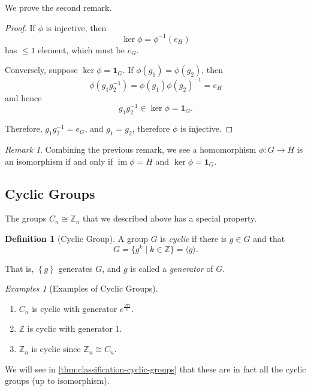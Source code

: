 \documentclass{article}
\theoremstyle{definition}
\newtheorem{definition}[theorem]{Definition}
\theoremstyle{remark}
\newtheorem{remark}[theorem]{Remark}
\newcommand{\pqty}[1]{\left(#1\right)}
\newcommand{\Bqty}[1]{\left\{#1\right\}}
\newcommand{\angBrac}[1]{\langle #1\rangle}
\newcommand{\set}[2]{\{#1\mid #2\}}
\newcommand{\functiondomain}[3]{#1:#2\to #3}
\newcommand{\inverse}{^{-1}}
\newcommand{\isomorphic}{\cong}
\newcommand{\ZZ}{\mathbb{Z}}
\newcommand{\img}{\operatorname{im}}
\newtheorem*{examples*}{Examples}
\newcommand{\trivialgp}{\mathbf{1}}
\begin{document}
We prove the second remark.

\begin{proof}
    If \(\phi\) is injective, then
    \[
        \ker \phi = \phi\inverse\pqty{e_H}
    \]
    has \(\leq 1\) element, which must be \(e_G\).

    Conversely, suppose \(\ker \phi = \trivialgp_G\). If \(\phi\pqty{g_1} = \phi\pqty{g_2}\), then
    \[
        \phi\pqty{g_1 g_2\inverse} = \phi\pqty{g_1} \phi\pqty{g_2}\inverse = e_H
    \]
    and hence
    \[
        g_1 g_2\inverse \in \ker \phi = \trivialgp_G.
    \]

    Therefore, \(g_1 g_2\inverse = e_G\), and \(g_1 = g_2\), therefore \(\phi\) is injective.
\end{proof}

\begin{remark}
    Combining the previous remark, we see a homomorphism \(\functiondomain{\phi}{G}{H}\) is an isomorphism if and only if \(\img \phi = H\) and \(\ker \phi = \trivialgp_G\).
\end{remark}

\subsection{Cyclic Groups}
\label{sec:cyclic-groups}

The groups \(C_n \isomorphic \ZZ_n\) that we described above has a special property.

\begin{definition}[Cyclic Group]
    \label{def:cyclic-group}%
    A group \(G\) is \emph{cyclic} if there is \(g \in G\) and that
    \[
        G = \set{g^k}{k \in \ZZ} = \angBrac{g}.
    \]

    That is, \(\Bqty{g}\) generates \(G\), and \(g\) is called a \emph{generator} of \(G\).
\end{definition}

\begin{examples*}[Examples of Cyclic Groups]
    \begin{enumerate}
        \item \(C_n\) is cyclic with generator \(e^{\frac{2 \pi i}{n}}\).
        \item \(\ZZ\) is cyclic with generator \(1\).
        \item \(\ZZ_n\) is cyclic since \(\ZZ_n \isomorphic C_n\).
    \end{enumerate}
\end{examples*}

We will see in \autoref{thm:classification-cyclic-groups} that these are in fact all the cyclic groups (up to isomorphism).
\end{document}
